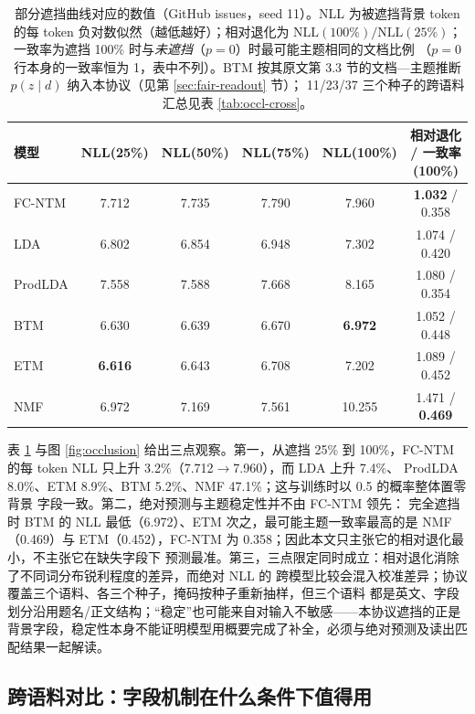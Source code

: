 \documentclass[11pt]{ctexart}
\newcommand{\fcntm}{FC-NTM}
\begin{document}
\begin{table}[t]
\centering
\caption{部分遮挡曲线对应的数值（GitHub issues，seed 11）。NLL 为被遮挡背景 token 的每
token 负对数似然（越低越好）；相对退化为 $\mathrm{NLL}(100\%)/\mathrm{NLL}(25\%)$；
一致率为遮挡 100\% 时与\emph{未遮挡}（$p=0$）时最可能主题相同的文档比例
（$p=0$ 行本身的一致率恒为 1，表中不列）。BTM 按其原文第 3.3 节的文档—主题推断
$p(z\mid d)$ 纳入本协议（见第 \ref{sec:fair-readout} 节）；
11/23/37 三个种子的跨语料汇总见表 \ref{tab:occl-cross}。}
\label{tab:occl-robust}
\small
\setlength{\tabcolsep}{4pt}
\begin{tabular}{@{}lccccc@{}}
\toprule
模型 & NLL(25\%) & NLL(50\%) & NLL(75\%) & NLL(100\%) & 相对退化 / 一致率(100\%) \\
\midrule
\fcntm{} & 7.712 & 7.735 & 7.790 & 7.960 & \textbf{1.032} / 0.358 \\
LDA & 6.802 & 6.854 & 6.948 & 7.302 & 1.074 / 0.420 \\
ProdLDA & 7.558 & 7.588 & 7.668 & 8.165 & 1.080 / 0.354 \\
BTM & 6.630 & 6.639 & 6.670 & \textbf{6.972} & 1.052 / 0.448 \\
ETM & \textbf{6.616} & 6.643 & 6.708 & 7.202 & 1.089 / 0.452 \\
NMF & 6.972 & 7.169 & 7.561 & 10.255 & 1.471 / \textbf{0.469} \\
\bottomrule
\end{tabular}
\end{table}

表 \ref{tab:occl-robust} 与图 \ref{fig:occlusion} 给出三点观察。第一，从遮挡 25\% 到
100\%，\fcntm{} 的每 token NLL 只上升 3.2\%（7.712$\rightarrow$7.960），而 LDA 上升 7.4\%、
ProdLDA 8.0\%、ETM 8.9\%、BTM 5.2\%、NMF 47.1\%；这与训练时以 0.5 的概率整体置零背景
字段一致。第二，绝对预测与主题稳定性并不由 \fcntm{} 领先：
完全遮挡时 BTM 的 NLL 最低（6.972）、ETM 次之，最可能主题一致率最高的是 NMF（0.469）与
ETM（0.452），\fcntm{} 为 0.358；因此本文只主张它的相对退化最小，不主张它在缺失字段下
预测最准。第三，三点限定同时成立：相对退化消除了不同词分布锐利程度的差异，而绝对 NLL 的
跨模型比较会混入校准差异；协议覆盖三个语料、各三个种子，掩码按种子重新抽样，但三个语料
都是英文、字段划分沿用题名/正文结构；“稳定”也可能来自对输入不敏感——本协议遮挡的正是
背景字段，稳定性本身不能证明模型用概要完成了补全，必须与绝对预测及读出匹配结果一起解读。

\subsection{跨语料对比：字段机制在什么条件下值得用}
\label{sec:cross-corpus}
\end{document}
